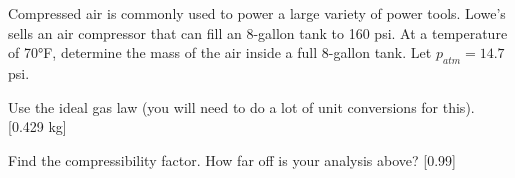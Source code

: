 \begin{homework}

\question Compressed air is commonly used to power a large variety of power tools.  Lowe's sells an air compressor that can fill an 8-gallon tank to 160 psi. At a temperature of 70°F, determine the mass of the air inside a full 8-gallon tank.  Let $p_{atm} = 14.7$ psi.
\begin{questionparts}

\item Use the ideal gas law (you will need to do a lot of unit conversions for this). \\{\color{red} [0.429 kg]}

\item Find the compressibility factor.  How far off is your analysis above? {\color{red} [0.99]}

\end{questionparts}
\end{homework}
